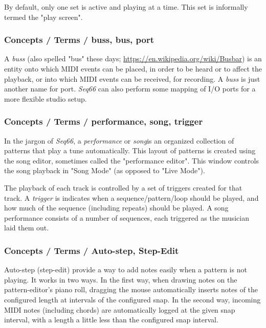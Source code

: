   By default, only one set is active and playing at a time.  This set is
   informally termed the "play screen".

\subsubsection{Concepts / Terms / buss, bus, port}
\label{subsubsec:concepts_terms_buss}

   A \textsl{buss} (also spelled "bus" these days;
   \url{https://en.wikipedia.org/wiki/Busbar}) is an entity onto which
   MIDI events can be placed, in order to be heard or to affect the
   playback, or into which MIDI events can be received, for recording.
   A \textsl{buss} is just another name for port.
   \textsl{Seq66} can also perform some mapping of I/O ports
   for a more flexible studio setup.

\subsubsection{Concepts / Terms / performance, song, trigger}
\label{subsubsec:concepts_terms_performance}

   In the jargon of \textsl{Seq66}, a
   \textsl{performance} or
   \textsl{song}is an organized collection of patterns that play a tune
   automatically.
   This layout of patterns is created using the song editor, sometimes
   called the "performance editor".
   This window controls the song playback in "Song Mode"
   (as opposed to "Live Mode").

   The playback of each track is controlled by a set of triggers created for
   that track.
   A \textsl{trigger} is indicates when a sequence/pattern/loop
   should be played, and how much of the sequence (including repeats) should be
   played.  A song performance consists of a number of sequences, each
   triggered as the musician laid them out.

\subsubsection{Concepts / Terms / Auto-step, Step-Edit}
\label{subsubsec:concepts_terms_auto_step}

   Auto-step (step-edit) provide a way to add notes easily when a pattern is
   not playing.  It works in two ways.  In the first way, when drawing notes on
   the pattern-editor's piano roll, dragging the mouse automatically inserts
   notes of the configured length at intervals of the configured snap.
   In the second way, incoming MIDI notes (including chords)
   are automatically logged at the given snap interval, with a length a little
   less than the configured snap interval.

